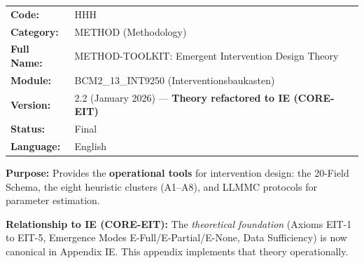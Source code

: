%
%
%
%


\begin{tcolorbox}[colback=gray!5!white, colframe=gray!75!black,
    title=Appendix Header: HHH METHOD-TOOLKIT]

\begin{tabular}{@{}ll@{}}
\textbf{Code:} & HHH \\
\textbf{Category:} & METHOD (Methodology) \\
\textbf{Full Name:} & METHOD-TOOLKIT: Emergent Intervention Design Theory \\
\textbf{Module:} & BCM2\_13\_INT9250 (Interventionsbaukasten) \\
\textbf{Version:} & 2.2 (January 2026) --- \textbf{Theory refactored to IE (CORE-EIT)} \\
\textbf{Status:} & Final \\
\textbf{Language:} & English \\
\end{tabular}

\vspace{0.5em}
\textbf{Purpose:} Provides the \textbf{operational tools} for intervention design:
the 20-Field Schema, the eight heuristic clusters (A1--A8), and LLMMC protocols
for parameter estimation.

\textbf{Relationship to IE (CORE-EIT):} The \textit{theoretical foundation} (Axioms EIT-1 to EIT-5,
Emergence Modes E-Full/E-Partial/E-None, Data Sufficiency) is now canonical in Appendix IE.
This appendix implements that theory operationally.

\end{tcolorbox}

